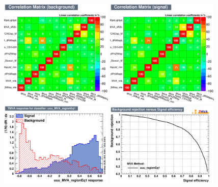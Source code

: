 \begin{figure}[htbp]
	\includegraphics[width=0.48\textwidth]{6_Search/Figures/MVAtechnics/toppairzut/uuu/CorrelationMatrixB.png}
	\includegraphics[width=0.48\textwidth]{6_Search/Figures/MVAtechnics/toppairzut/uuu/CorrelationMatrixS.png}
	\includegraphics[width=0.48\textwidth]{6_Search/Figures/MVAtechnics/toppairzut/uuu/mva_uuu_MVA_regionEq1.png}
	\includegraphics[width=0.48\textwidth]{6_Search/Figures/MVAtechnics/toppairzut/uuu/rejBvsS.png}

\end{figure}
